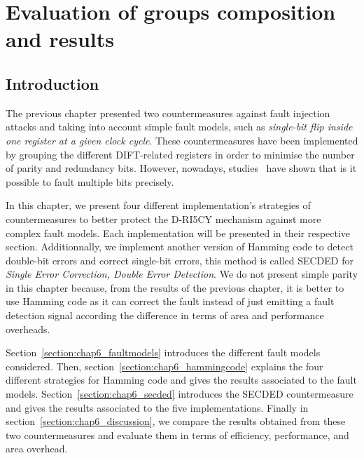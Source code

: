 \chapter{Evaluation of groups composition and results}
\label{chapter:exp_setup_results}
\minitoc

\section{Introduction}
The previous chapter presented two countermeasures against fault injection attacks and taking into account simple fault models, such as \textit{single-bit flip inside one register at a given clock cycle}. These countermeasures have been implemented by grouping the different DIFT-related registers in order to minimise the number of parity and redundancy bits. However, nowadays, studies~\cite{CGVCBLC-22-cardis,VDSPB-24-jce} have shown that is it possible to fault multiple bits precisely.

In this chapter, we present four different implementation's strategies of countermeasures to better protect the D-RI5CY mechanism against more complex fault models. Each implementation will be presented in their respective section. Additionnally, we implement another version of Hamming code to detect double-bit errors and correct single-bit errors, this method is called SECDED for \textit{Single Error Correction, Double Error Detection}. We do not present simple parity in this chapter because, from the results of the previous chapter, it is better to use Hamming code as it can correct the fault instead of just emitting a fault detection signal according the difference in terms of area and performance overheads.

Section~\ref{section:chap6_faultmodels} introduces the different fault models considered.
Then, section~\ref{section:chap6_hammingcode} explains the four different strategies for Hamming code and gives the results associated to the fault models.
Section~\ref{section:chap6_secded} introduces the SECDED countermeasure and gives the results associated to the five implementations.
Finally in section~\ref{section:chap6_discussion}, we compare the results obtained from these two countermeasures and evaluate them in terms of efficiency, performance, and area overhead.

